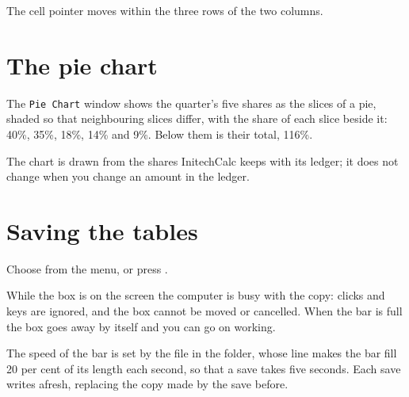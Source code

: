   The cell pointer moves within the three
rows of the two columns.


\section{The pie chart}
The \texttt{Pie Chart} window shows the quarter's five shares as the
slices of a pie, shaded so that neighbouring slices differ, with the share
of each slice beside it: 40\%, 35\%, 18\%, 14\% and 9\%.  Below them is
their total, 116\%.


The chart is drawn from the shares InitechCalc keeps with its ledger; it
does not change when you change an amount in the ledger.

\section{Saving the tables}
\begin{TaskSteps}
\Step Choose  from the  menu, or press
.
\end{TaskSteps}


While the box is on the screen the computer is busy with the copy: clicks
and keys are ignored, and the box cannot be moved or cancelled.  When the
bar is full the box goes away by itself and you can go on working.

The speed of the bar is set by the file  in the
 folder, whose line  makes the bar
fill 20 per cent of its length each second, so that a save takes five
seconds.  Each save writes  afresh, replacing the copy
made by the save before.

